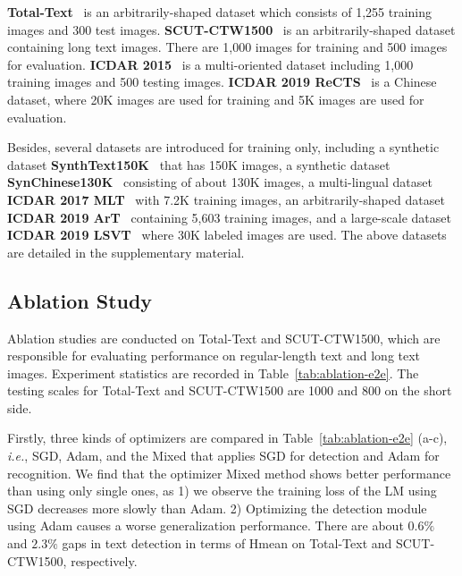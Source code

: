 \documentclass[10pt,journal,compsoc]{IEEEtran}
\def\ie{{\it i.e.}\xspace}
\begin{document}
\textbf{Total-Text}~\cite{ch2020total} is an arbitrarily-shaped dataset which consists of 1,255 training images and 300 test images. \textbf{SCUT-CTW1500}~\cite{liu2019curved} is an arbitrarily-shaped dataset containing long text images. There are 1,000 images for training and 500 images for evaluation. \textbf{ICDAR 2015}~\cite{karatzas2015icdar} is a multi-oriented dataset including 1,000 training images and 500 testing images. \textbf{ICDAR 2019 ReCTS}~\cite{zhang2019icdar} is a Chinese dataset, where 20K images are used for training and 5K images are used for evaluation.

Besides, several datasets are introduced for training only, including a synthetic dataset \textbf{SynthText150K}~\cite{liu2020abcnetv2,liu2020abcnet} that has 150K images, a synthetic dataset \textbf{SynChinese130K}~\cite{liu2020abcnetv2} consisting of about 130K images, a multi-lingual dataset \textbf{ICDAR 2017 MLT}~\cite{nayef2017icdar2017} with 7.2K training images, an arbitrarily-shaped dataset \textbf{ICDAR 2019 ArT}~\cite{chng2019icdar2019} containing 5,603 training images, and a large-scale dataset \textbf{ICDAR 2019 LSVT}~\cite{sun2019icdar} where 30K labeled images are used. The above datasets are detailed in the supplementary material.


\subsection{Ablation Study}
\label{sec:exp_e2e_ablation}

Ablation studies are conducted on Total-Text and SCUT-CTW1500, which are responsible for evaluating performance on regular-length text and long text images. Experiment statistics are recorded in Table~\ref{tab:ablation-e2e}. The testing scales for Total-Text and SCUT-CTW1500 are 1000 and 800 on the short side.


Firstly, three kinds of optimizers are compared in Table~\ref{tab:ablation-e2e} (a-c), \ie, SGD, Adam, and the Mixed that applies SGD for detection and Adam for recognition. We find that the optimizer Mixed method shows better performance than using only single ones, as 1) we observe the training loss of the LM using SGD decreases more slowly than Adam. 2) Optimizing the detection module using Adam causes a worse generalization performance. There are about $0.6\%$ and $2.3\%$ gaps in text detection in terms of Hmean on Total-Text and SCUT-CTW1500, respectively.
\end{document}
